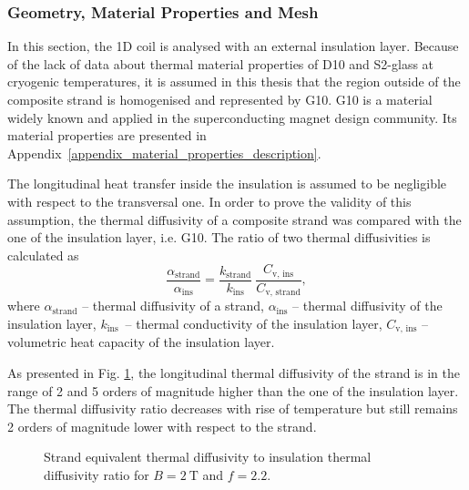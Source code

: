 
\subsubsection{Geometry, Material Properties and Mesh}

In this section, the 1D coil is analysed with an external insulation layer. Because of the lack of data about thermal material properties of D10 and S2-glass at cryogenic temperatures, it is assumed in this thesis that the region outside of the composite strand is homogenised and represented by G10. G10 is a material widely known and applied in the superconducting magnet design community. Its material properties are presented in Appendix~\ref{appendix_material_properties_description}.

The longitudinal heat transfer inside the insulation is assumed to be negligible with respect to the transversal one. In order to prove the validity of this assumption, the thermal diffusivity of a composite strand was compared with the one of the insulation layer, i.e. G10. The ratio of two thermal diffusivities is calculated as
\begin{equation}
    \frac{\alpha_\text{strand}}{\alpha_\text{ins}} = \frac{k_\text{strand}}{k_\text{ins}}~\frac{C_\text{v, ins}}{C_\text{v, strand}},
    \label{eqn: diffusivity_strand_to_insulation_ratio}
\end{equation}
where $\alpha_\text{strand}$ -- thermal diffusivity of a strand, $\alpha_\text{ins}$ -- thermal diffusivity of the insulation layer, $k_\text{ins}$~-- thermal conductivity of the insulation layer, $C_\text{v, ins}$ -- volumetric heat capacity of the insulation layer. 

As presented in Fig. \ref{fig:diffusivity_strand_to_insulation_ratio}, the longitudinal thermal diffusivity of the strand is in the range of 2 and 5 orders of magnitude higher than the one of the insulation layer. The thermal diffusivity ratio decreases with rise of temperature but still remains 2 orders of magnitude lower with respect to the strand.

\begin{figure}[H]
\centering
    \caption{Strand equivalent thermal diffusivity to insulation thermal diffusivity ratio for $B=2~\text{T}$ and $f=2.2$.}
    \label{fig:diffusivity_strand_to_insulation_ratio}
\end{figure}


